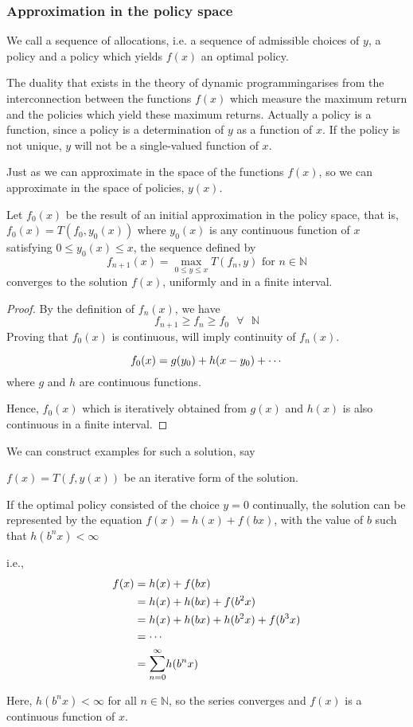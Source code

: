 \subsubsection{Approximation in the policy space}
We call a sequence of allocations, i.e. a sequence of admissible choices of $y$, a policy and a policy which yields $f(x)$ an optimal policy. 

The duality that exists in the theory of dynamic programmingarises
from the interconnection between the functions $f(x)$ which measure the maximum return and the policies which yield these maximum returns. Actually a policy is a function, since a policy is a determination of $y$ as a function of $x$. If the policy is not unique, $y$ will not be a single-valued function of $x$.

Just as we can approximate in the space of the functions $f(x)$, so we can approximate in the space of policies, $y(x)$.

\begin{theorem}
    Let $f_0(x)$ be the result of an initial approximation in the policy space, that is, $f_0(x)=T(f_0, y_0(x))$ where $y_0(x)$ is any continuous function of $x$ satisfying $0 \le y_0(x) \le x$, the sequence defined by
    $$
    f_{n+1}(x) = \max_{0 \le y \le x} T(f_n, y) \text{ for } n \in \mathbb{N}
    $$
    converges to the solution $f(x)$, uniformly and in a finite interval.
\end{theorem}
\begin{proof}
    By the definition of $f_n(x)$, we have
    $$f_{n+1} \ge f_n \ge f_0 \text{ }\forall \text{ }\mathbb{N}$$
    Proving that $f_0(x)$ is continuous, will imply continuity of $f_n(x)$.

    $$
    f_0(x) = g(y_0) + h(x-y_0) + \cdots\\
    $$
    where $g$ and $h$ are continuous functions.

    Hence, $f_0(x)$ which is iteratively obtained from $g(x)$ and $h(x)$ is also continuous in a finite interval.

\end{proof}
We can construct examples for such a solution, say
\begin{example*}
    $f(x) = T(f, y(x))$ be an iterative form of the solution.

    If the optimal policy consisted of the choice $y=0$ continually, the solution can be represented by the equation $f(x)=h(x)+f(bx)$, with the value of $b$ such that $h(b^nx) < \infty$
    
    i.e.,
    \begin{align*}
        f(x) &= h(x) + f(bx)\\
             &= h(x) + h(bx) + f(b^2x)\\
             &= h(x) + h(bx) + h(b^2x) + f(b^3x)\\
             &= \cdots\\
             &= \bigsum_{n=0}^{\infty} h(b^n x)\\
    \end{align*}

    Here, $h(b^n x) < \infty$ for all $n \in \mathbb{N}$, so the series converges and $f(x)$ is a continuous function of $x$.
\end{example*}

